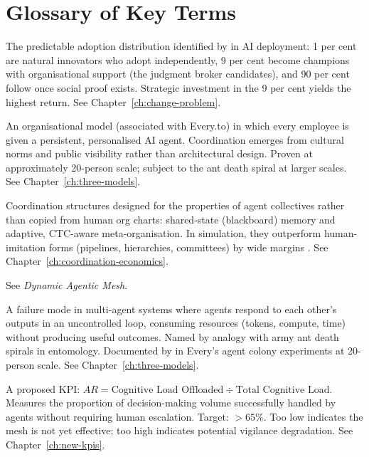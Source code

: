 \chapter{Glossary of Key Terms}
\label{ch:glossary}

\begin{description}[style=nextline, leftmargin=2em, font=\bfseries\color{navyblue}]

\item[1-9-90 Pattern]
The predictable adoption distribution identified by \textcite{BCGAgenticShift2025} in AI deployment: 1 per cent are natural innovators who adopt independently, 9 per cent become champions with organisational support (the judgment broker candidates), and 90 per cent follow once social proof exists. Strategic investment in the 9 per cent yields the highest return. See Chapter~\ref{ch:change-problem}.

\item[Agent Colony]
An organisational model (associated with Every.to) in which every employee is given a persistent, personalised AI agent. Coordination emerges from cultural norms and public visibility rather than architectural design. Proven at approximately 20-person scale; subject to the ant death spiral at larger scales. See Chapter~\ref{ch:three-models}.

\item[Agent-Native Organisation Forms]
Coordination structures designed for the properties of agent collectives rather than copied from human org charts: shared-state (blackboard) memory and adaptive, CTC-aware meta-organisation. In simulation, they outperform human-imitation forms (pipelines, hierarchies, committees) by wide margins \parencite{Liu2026}. See Chapter~\ref{ch:coordination-economics}.

\item[Agentic Mesh]
See \emph{Dynamic Agentic Mesh}.

\item[Ant Death Spiral]
A failure mode in multi-agent systems where agents respond to each other's outputs in an uncontrolled loop, consuming resources (tokens, compute, time) without producing useful outcomes. Named by analogy with army ant death spirals in entomology. Documented by \textcite{Shipper2026} in Every's agent colony experiments at 20-person scale. See Chapter~\ref{ch:three-models}.

\item[Augmentation Ratio (AR)]
A proposed KPI: $AR = \text{Cognitive Load Offloaded} \div \text{Total Cognitive Load}$. Measures the proportion of decision-making volume successfully handled by agents without requiring human escalation. Target: $>65\%$. Too low indicates the mesh is not yet effective; too high indicates potential vigilance degradation. See Chapter~\ref{ch:new-kpis}.


\end{description}
